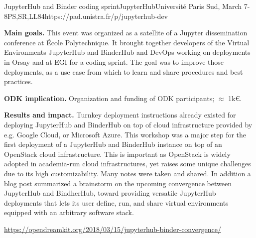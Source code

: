 \begin{event}{JupyterHub and Binder coding sprint}{JupyterHub}{Université Paris Sud, March 7-8}{PS,SR,LL}{8}{4}{https://pad.unistra.fr/p/jupyterhub-dev}

  \textbf{Main goals.} This event was organized as a satellite of a
  Jupyter dissemination conference at École Polytechnique. It brought
  together developers of the Virtual Environments JupyterHub and
  BinderHub and DevOps working on deployments in Orsay and at EGI for
  a coding sprint. The goal was to improve those deployments, as a use
  case from which to learn and share procedures and best practices.

  \textbf{ODK implication.} Organization and funding of ODK participants; $\approx$ 1k\euro.

  \textbf{Results and impact.} Turnkey deployment instructions already
  existed for deploying JupyterHub and BinderHub on top of cloud
  infrastructure provided by e.g. Google Cloud, or Microsoft Azure.
  This workshop was a major step for the first deployment of a
  JupyterHub and BinderHub instance on top of an OpenStack cloud
  infrastructure. This is important as OpenStack is widely adopted in
  academia-run cloud infrastructures, yet raises some unique
  challenges due to its high customizability. Many notes were taken
  and shared. In addition a blog post summarized a brainstorm on the
  upcoming convergence between JupyterHub and BindherHub, toward
  providing versatile JupyterHub deployments that lets its user
  define, run, and share virtual environments equipped with an
  arbitrary software stack.

  \url{https://opendreamkit.org/2018/03/15/jupyterhub-binder-convergence/}
\end{event}
